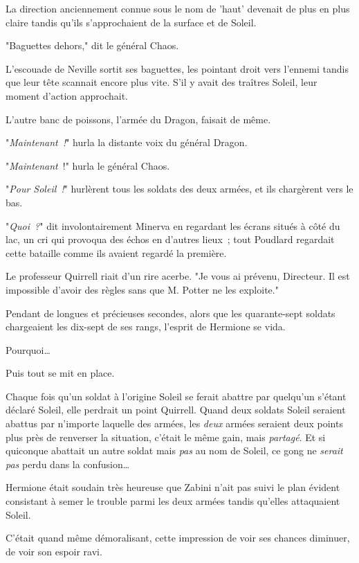 La direction anciennement connue sous le nom de 'haut' devenait de plus en plus claire tandis qu'ils s'approchaient de la surface et de Soleil.

"Baguettes dehors," dit le général Chaos.

L'escouade de Neville sortit ses baguettes, les pointant droit vers l'ennemi tandis que leur tête scannait encore plus vite. S'il y avait des traîtres Soleil, leur moment d'action approchait.

L'autre banc de poissons, l'armée du Dragon, faisait de même.

"\emph{Maintenant~!}" hurla la distante voix du général Dragon.

"\emph{Maintenant}~!" hurla le général Chaos.

"\emph{Pour Soleil~!}" hurlèrent tous les soldats des deux armées, et ils chargèrent vers le bas.

\later

"\emph{Quoi~?}" dit involontairement Minerva en regardant les écrans situés à côté du lac, un cri qui provoqua des échos en d'autres lieux~; tout Poudlard regardait cette bataille comme ils avaient regardé la première.

Le professeur Quirrell riait d'un rire acerbe. "Je vous ai prévenu, Directeur. Il est impossible d'avoir des règles sans que M. Potter ne les exploite."

\later

Pendant de longues et précieuses secondes, alors que les quarante-sept soldats chargeaient les dix-sept de ses rangs, l'esprit de Hermione se vida.

Pourquoi…

Puis tout se mit en place.

Chaque fois qu'un soldat à l'origine Soleil se ferait abattre par quelqu'un s'étant déclaré Soleil, elle perdrait un point Quirrell. Quand deux soldats Soleil seraient abattus par n'importe laquelle des armées, les \emph{deux} armées seraient deux points plus près de renverser la situation, c'était le même gain, mais \emph{partagé}. Et si quiconque abattait un autre soldat mais \emph{pas} au nom de Soleil, ce gong ne \emph{serait pas} perdu dans la confusion…

Hermione était soudain très heureuse que Zabini n'ait pas suivi le plan évident consistant à semer le trouble parmi les deux armées tandis qu'elles attaquaient Soleil.

C'était quand même démoralisant, cette impression de voir ses chances diminuer, de voir son espoir ravi.

